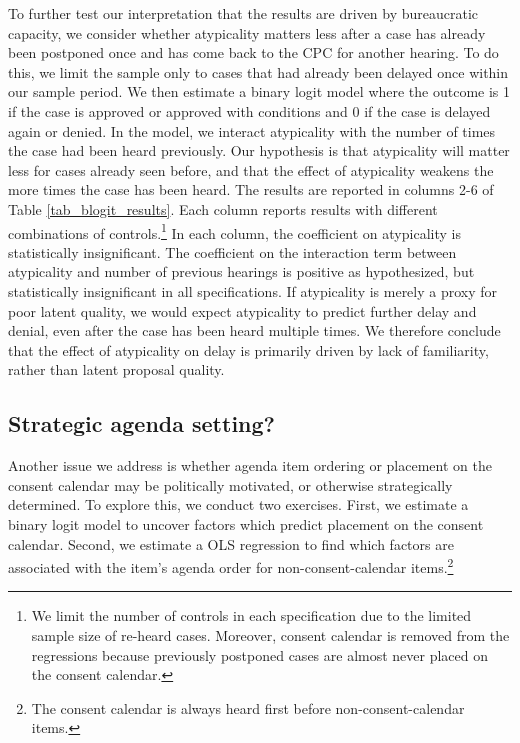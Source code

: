 To further test our interpretation that the results are driven by bureaucratic capacity, we consider whether atypicality matters less after a case has already been postponed once and has come back to the CPC for another hearing. To do this, we limit the sample only to cases that had already been delayed once within our sample period.  We then estimate a binary logit model where the outcome is 1 if the case is approved or approved with conditions and 0 if the case is delayed again or denied. In the model, we interact atypicality with the number of times the case had been heard previously. Our hypothesis is that atypicality will matter less for cases already seen before, and that the effect of atypicality weakens the more times the case has been heard. The results are reported in columns 2-6 of Table \ref{tab_blogit_results}. Each column reports results with different combinations of controls.\footnote{We limit the number of controls in each specification due to the limited sample size of re-heard cases. Moreover, consent calendar is removed from the regressions because previously postponed cases are almost never placed on the consent calendar.} In each column, the coefficient on atypicality is statistically insignificant. The coefficient on the interaction term between atypicality and number of previous hearings is positive as hypothesized, but statistically insignificant in all specifications. If atypicality is merely a proxy for poor latent quality, we would expect atypicality to predict further delay and denial, even after the case has been heard multiple times. We therefore conclude that the effect of atypicality on delay is primarily driven by lack of familiarity, rather than latent proposal quality.

\subsection{Strategic agenda setting?}

Another issue we address is whether agenda item ordering or placement on the consent calendar may be politically motivated, or otherwise strategically determined. To explore this, we conduct two exercises. First, we estimate a binary logit model to uncover factors which predict placement on the consent calendar. Second, we estimate a OLS regression to find which factors are associated with the item's agenda order for non-consent-calendar items.\footnote{The consent calendar is always heard first before non-consent-calendar items.} 

